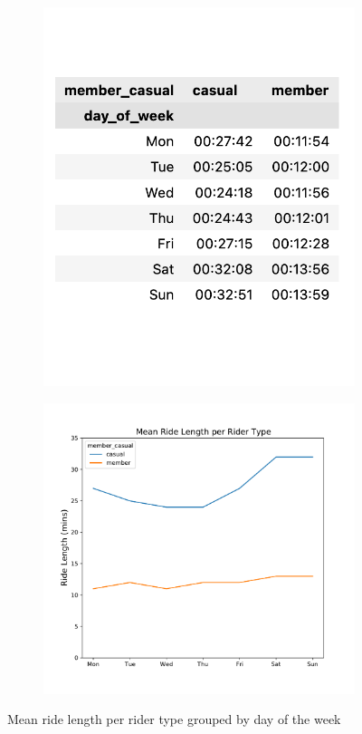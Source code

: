 \documentclass[12pt]{article}
\begin{document}
	\begin{figure}[h]
	\hspace{0.8in}
	\begin{subfigure}{.2\textwidth}
		\includegraphics[scale=0.53]{dayofweek_t.png} 
	\end{subfigure}
	\begin{subfigure}{.55\textwidth}
	\hspace{1.2in}
		\includegraphics[scale=0.43]{mean_ridelength_line_dayofweek.pdf}
	\end{subfigure}
	\caption{Mean ride length per rider type grouped by day of the week}
	\label{fig14}
	\end{figure}
	\pagebreak
\end{document}
